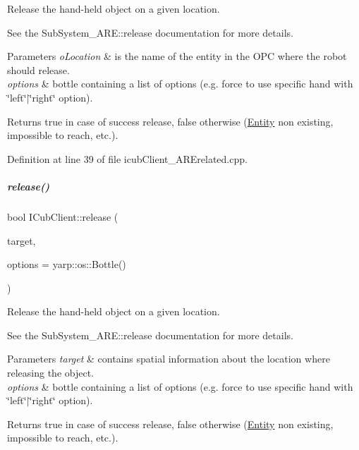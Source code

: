 Release the hand-\/held object on a given location. 

See the Sub\+System\+\_\+\+A\+R\+E\+::release documentation for more details. 
\begin{DoxyParams}{Parameters}
{\em o\+Location} & is the name of the entity in the O\+PC where the robot should release. \\
\hline
{\em options} & bottle containing a list of options (e.\+g. force to use specific hand with \char`\"{}left\char`\"{}$\vert$\char`\"{}right\char`\"{} option). \\
\hline
\end{DoxyParams}
\begin{DoxyReturn}{Returns}
true in case of success release, false otherwise (\hyperlink{group__icubclient__representations_classicubclient_1_1Entity}{Entity} non existing, impossible to reach, etc.). 
\end{DoxyReturn}


Definition at line 39 of file icub\+Client\+\_\+\+A\+R\+Erelated.\+cpp.

\mbox{\label{group__icubclient__clients_abf66ab5453dc661233d7cc9d85b42617}} 
\subparagraph{\texorpdfstring{release()}{release()}\hspace{0.1cm}{\footnotesize\ttfamily [2/2]}}
{\footnotesize\ttfamily bool I\+Cub\+Client\+::release (\begin{DoxyParamCaption}\item[{const yarp\+::sig\+::\+Vector\+Of$<$ double $>$ \&}]{target,  }\item[{const yarp\+::os\+::\+Bottle \&}]{options = {\ttfamily yarp\+:\+:os\+:\+:Bottle()} }\end{DoxyParamCaption})}



Release the hand-\/held object on a given location. 

See the Sub\+System\+\_\+\+A\+R\+E\+::release documentation for more details. 
\begin{DoxyParams}{Parameters}
{\em target} & contains spatial information about the location where releasing the object. \\
\hline
{\em options} & bottle containing a list of options (e.\+g. force to use specific hand with \char`\"{}left\char`\"{}$\vert$\char`\"{}right\char`\"{} option). \\
\hline
\end{DoxyParams}
\begin{DoxyReturn}{Returns}
true in case of success release, false otherwise (\hyperlink{group__icubclient__representations_classicubclient_1_1Entity}{Entity} non existing, impossible to reach, etc.). 
\end{DoxyReturn}


